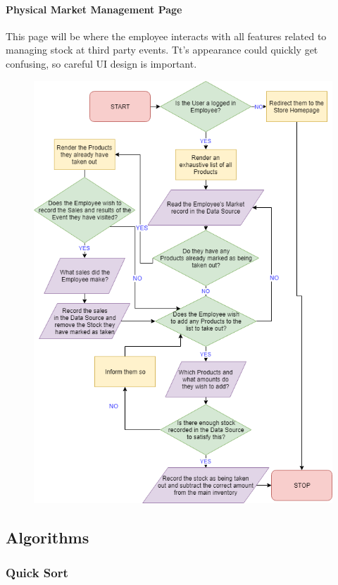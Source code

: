 ﻿\documentclass{article}
\begin{document}
    \paragraph{Physical Market Management Page}
    This page will be where the employee interacts with all features related to managing stock at third party events.
    Tt's appearance could quickly get confusing, so careful UI design is important.
    \begin{figure}[H]
    \includegraphics[scale=0.6]{physicalMarket.png}
    \centering
    \end{figure}
    
    \subsection{Algorithms}
    \subsubsection{Quick Sort}
\end{document}
